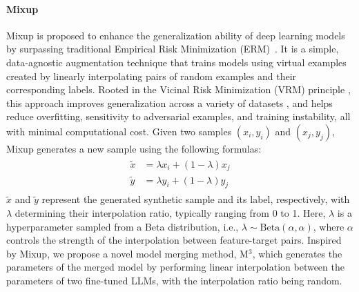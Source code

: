 \paragraph{\textbf{{Mixup}}}
Mixup is proposed to enhance the generalization ability of deep learning models by surpassing traditional Empirical Risk Minimization (ERM)~\citep{zhang2017mixup}. It is a simple, data-agnostic augmentation technique that trains models using virtual examples created by linearly interpolating pairs of random examples and their corresponding labels. Rooted in the Vicinal Risk Minimization (VRM) principle \citep{chapelle2000vicinal}, this approach improves generalization across a variety of datasets \citep{russakovsky2015imagenet, krizhevsky2009learning, warden2017launching, asuncion2007uci}, and helps reduce overfitting, sensitivity to adversarial examples, and training instability, all with minimal computational cost. Given two samples $(x_i, y_i)$ and $(x_j, y_j)$, Mixup generates a new sample using the following formulas:
\begin{align}
\begin{aligned}
\tilde{x} &= \lambda x_i + (1 - \lambda) x_j \\
\tilde{y} &= \lambda y_i + (1 - \lambda) y_j
\end{aligned}
\end{align}
$\tilde{x}$ and $\tilde{y}$ represent the generated synthetic sample and its label, respectively, with $\lambda$ determining their interpolation ratio, typically ranging from 0 to 1. Here, $\lambda$ is a hyperparameter sampled from a Beta distribution, i.e., $\lambda \sim \text{Beta}(\alpha, \alpha)$, where $\alpha$ controls the strength of the interpolation between feature-target pairs.
Inspired by Mixup, we propose a novel model merging method, M$^3$, which generates the parameters of the merged model by performing linear interpolation between the parameters of two fine-tuned LLMs, with the interpolation ratio being random.